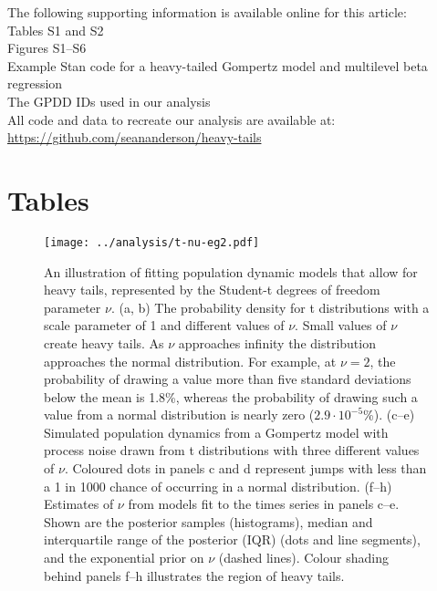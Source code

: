The following supporting information is available online for this article:\\
Tables S1 and S2\\
Figures S1--S6\\
Example Stan code for a heavy-tailed Gompertz model and multilevel beta
regression\\
The GPDD IDs used in our analysis\\
All code and data to recreate our analysis are available at:\\
\url{https://github.com/seananderson/heavy-tails}




\clearpage

\section{Tables}



\clearpage

\begin{figure}[htbp]
\begin{center}
\texttt{[image: ../analysis/t-nu-eg2.pdf]}
\caption{
An illustration of fitting population dynamic models that allow for heavy tails, represented by the Student-t degrees of freedom parameter $\nu$. (a, b) The probability density for t distributions with a scale parameter of 1 and different values of $\nu$. Small values of $\nu$ create heavy tails. As $\nu$ approaches infinity the distribution approaches the normal distribution. For example, at $\nu = 2$, the probability of drawing a value more than five standard deviations below the mean is 1.8\%, whereas the probability of drawing such a value from a normal distribution is nearly zero ($2.9\cdot10^{-5}$\%). (c--e) Simulated population dynamics from a Gompertz model with process noise drawn from t distributions with three different values of $\nu$. Coloured dots in panels c and d represent jumps with less than a 1 in 1000 chance of occurring in a normal distribution. (f--h) Estimates of $\nu$ from models fit to the times series in panels c--e. Shown are the posterior samples (histograms), median and interquartile range of the posterior (IQR) (dots and line segments), and the exponential prior on $\nu$ (dashed lines). Colour shading behind panels f--h illustrates the region of heavy tails.
}
\label{fig:didactic}
\end{center}
\end{figure}

